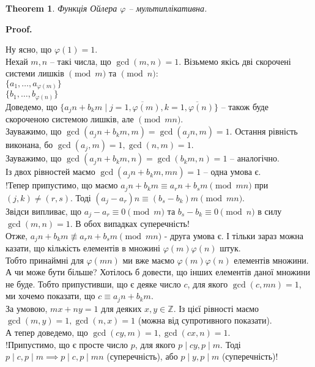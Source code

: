 \documentclass[a4paper, 14pt]{extarticle}
\makeatletter
\theoremstyle{theoremdd}
\newtheorem{theorem}{Theorem}[subsection]
\theoremstyle{theoremdd}
\theoremstyle{theoremdd}
\theoremstyle{theoremdd}
\theoremstyle{theoremdd}
\theoremstyle{theoremdd}
\theoremstyle{theoremdd}
\theoremstyle{theoremdd}
\def\qed{$\blacksquare$}
\renewenvironment{proof}[1][Proof.\\]{\par
\pushQED{\hfill \qed}%
\normalfont \topsep6\p@\@plus6\p@\relax
\trivlist
\item\relax
{\bfseries
#1\@addpunct{.}}\hspace\labelsep\ignorespaces
}{%
\popQED\endtrivlist\@endpefalse
}
\makeatother
\begin{document}
\begin{theorem}
Функція Ойлера $\varphi$ -- мультиплікативна.
\end{theorem}

\begin{proof}
Ну ясно, що $\varphi(1) = 1$.\\
Нехай $m,n$ -- такі числа, що $\gcd(m,n) = 1$. Візьмемо якісь дві скорочені системи лишків $\pmod m$ та $\pmod n$:\\
$\{a_1,\dots,a_{\varphi(m)}\}$\\
$\{b_1,\dots,b_{\varphi(n)}\}$\\
Доведемо, що $\{a_j n + b_k m \mid j = \overline{1,\varphi(m)}, k = \overline{1,\varphi(n)}\}$ -- також буде скороченою системою лишків, але $\pmod {mn}$.\\
Зауважимо, що $\gcd(a_jn + b_km,m) = \gcd(a_jn,m) = 1$. Остання рівність виконана, бо $\gcd(a_j,m) = 1, \gcd(n,m) = 1$.\\
Зауважимо, що $\gcd(a_jn + b_km,n) = \gcd(b_km,n) = 1$ -- аналогічно.\\
Із двох рівностей маємо $\gcd(a_jn+b_km, mn) = 1$ -- одна умова є.\\
!Тепер припустимо, що маємо $a_j n + b_k m \equiv a_rn + b_sm \pmod {mn}$ при $(j,k) \neq (r,s)$. Тоді
$(a_j - a_r)n \equiv (b_s-b_k) m \pmod {mn}$.\\
Звідси випливає, що $a_j - a_r \equiv 0 \pmod {m}$ та $b_s - b_k \equiv 0 \pmod {n}$ в силу $\gcd(m,n)=1$. В обох випадках суперечність!\\
Отже, $a_j n + b_k m \not\equiv a_r n + b_s m \pmod {mn}$ - друга умова є. І тільки зараз можна казати, що кількість елементів в множині $\varphi(m)\varphi(n)$ штук.\\
Тобто принаймні для $\varphi(mn)$ ми вже маємо $\varphi(m)\varphi(n)$ елементів множини. А чи може бути більше? Хотілось б довести, що інших елементів даної множини не буде. Тобто припустивши, що є деяке число $c$, для якого $\gcd(c,mn) = 1$, ми хочемо показати, що $c \equiv a_j n + b_k m$.\\
За умовою, $mx + ny = 1$ для деяких $x,y \in \mathbb{Z}$. Із цієї рівності маємо $\gcd(m,y) = 1, \gcd(n,x) = 1$ (можна від супротивного показати).\\
А тепер доведемо, що $\gcd(cy,m) = 1, \gcd(cx,n) = 1$.\\
!Припустимо, що є просте число $p$, для якого $p \mid cy, p \mid m$. Тоді $p \mid c,p \mid m \implies p \mid c,p \mid mn$ (суперечність), або $p \mid y,p \mid m$ (суперечність)!\\

\end{proof}
\end{document}
